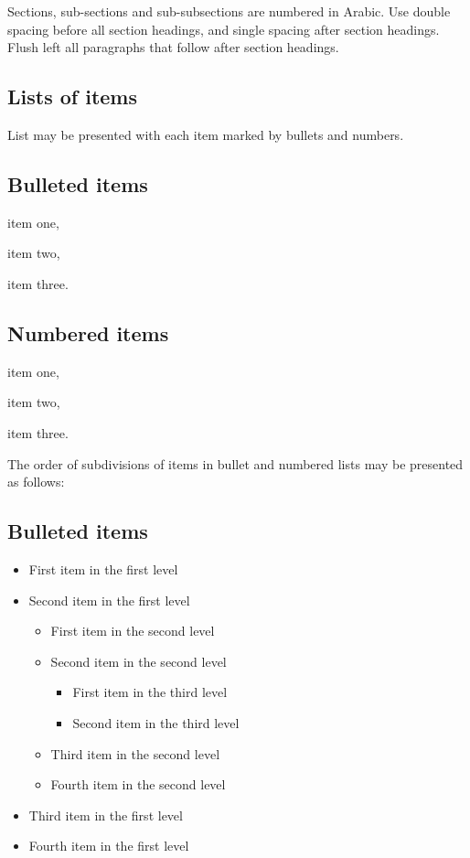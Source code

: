 \documentclass{ws-ijseke}
\begin{document}
Sections, sub-sections and sub-subsections are numbered in Arabic.
Use double spacing before all section headings, and single spacing
after section headings. Flush left all paragraphs that follow after
section headings.

\subsection{Lists of items}

List may be presented with each item marked by bullets and numbers.

\subsection*{Bulleted items}

\begin{itemlist}
 \item item one,
 \item item two,
 \item item three.
\end{itemlist}

\subsection*{Numbered items}

\begin{arabiclist}
 \item item one,
 \item item two,
 \item item three.
\end{arabiclist}

The order of subdivisions of items in bullet and numbered lists
may be presented as follows:

\subsection*{Bulleted items}

\begin{itemize}
\item First item in the first level
\item Second item in the first level
\begin{itemize}
\item First item in the second level 
\item Second item in the second level
\begin{itemize}
\item First item in the third level 
\item Second item in the third level
\end{itemize}
\item Third item in the second level
\item Fourth item in the second level
\end{itemize}
\item Third item in the first level
\item Fourth item in the first level
\end{itemize}
\end{document}
